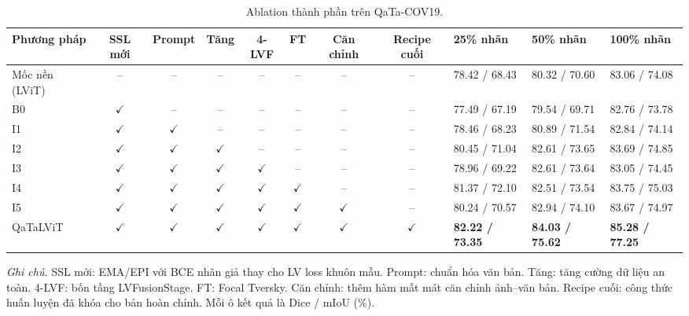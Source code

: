 \begin{table}[!t]
  \centering
  \caption{Ablation thành phần trên QaTa-COV19.}
  \label{tab:ablation}
  \scriptsize
  \renewcommand{\arraystretch}{1.14}
  \setlength{\tabcolsep}{2.5pt}
  \begin{tabularx}{\textwidth}{@{}lcccccccYYY@{}}
    \toprule
    Phương pháp & SSL mới & Prompt & Tăng & 4-LVF & FT & Căn chỉnh & Recipe cuối & 25\% nhãn & 50\% nhãn & 100\% nhãn \\
    \midrule
    Mốc nền (LViT) & -- & -- & -- & -- & -- & -- & -- & 78.42 / 68.43 & 80.32 / 70.60 & 83.06 / 74.08 \\
    B0 & \(\checkmark\) & -- & -- & -- & -- & -- & -- & 77.49 / 67.19 & 79.54 / 69.71 & 82.76 / 73.78 \\
    I1 & \(\checkmark\) & \(\checkmark\) & -- & -- & -- & -- & -- & 78.46 / 68.23 & 80.89 / 71.54 & 82.84 / 74.14 \\
    I2 & \(\checkmark\) & \(\checkmark\) & \(\checkmark\) & -- & -- & -- & -- & 80.45 / 71.04 & 82.61 / 73.65 & 83.69 / 74.85 \\
    I3 & \(\checkmark\) & \(\checkmark\) & \(\checkmark\) & \(\checkmark\) & -- & -- & -- & 78.96 / 69.22 & 82.61 / 73.64 & 83.05 / 74.45 \\
    I4 & \(\checkmark\) & \(\checkmark\) & \(\checkmark\) & \(\checkmark\) & \(\checkmark\) & -- & -- & 81.37 / 72.10 & 82.51 / 73.54 & 83.75 / 75.03 \\
    I5 & \(\checkmark\) & \(\checkmark\) & \(\checkmark\) & \(\checkmark\) & \(\checkmark\) & \(\checkmark\) & -- & 80.24 / 70.57 & 82.94 / 74.10 & 83.67 / 74.97 \\
    QaTaLViT & \(\checkmark\) & \(\checkmark\) & \(\checkmark\) & \(\checkmark\) & \(\checkmark\) & \(\checkmark\) & \(\checkmark\) & \textbf{82.22 / 73.35} & \textbf{84.03 / 75.62} & \textbf{85.28 / 77.25} \\
    \bottomrule
  \end{tabularx}
\tablenotesep
\begin{minipage}{0.98\textwidth}
\scriptsize
\textit{Ghi chú.} SSL mới: EMA/EPI với BCE nhãn giả thay cho LV loss khuôn mẫu.
Prompt: chuẩn hóa văn bản.
Tăng: tăng cường dữ liệu an toàn.
4-LVF: bốn tầng LVFusionStage.
FT: Focal Tversky.
Căn chỉnh: thêm hàm mất mát căn chỉnh ảnh--văn bản.
Recipe cuối: công thức huấn luyện đã khóa cho bản hoàn chỉnh.
Mỗi ô kết quả là Dice / mIoU (\%).
\end{minipage}
\end{table}

